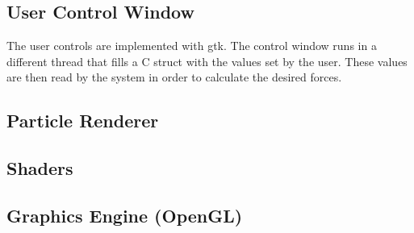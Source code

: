 \documentclass[runningheads,a4paper]{llncs}
\begin{document}
\subsection{User Control Window}
The user controls are implemented with gtk. The control window runs in a different thread that fills a C struct with the values set by the user. These values are then read by the system in order to calculate the desired forces.

\subsection{Particle Renderer}

\subsection{Shaders}

\subsection{Graphics Engine (OpenGL)}









\end{document}
